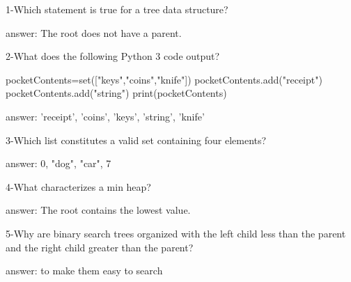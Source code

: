 1-Which statement is true for a tree data structure?


answer: The root does not have a parent.

2-What does the following Python 3 code output?

pocketContents=set(["keys","coins","knife"])
pocketContents.add("receipt")
pocketContents.add("string")
print(pocketContents)

answer: {'receipt', 'coins', 'keys', 'string', 'knife'}

3-Which list constitutes a valid set containing four elements?

answer: {0, "dog", "car", 7}

4-What characterizes a min heap?


answer: The root contains the lowest value.

5-Why are binary search trees organized with the left child less than the parent and the right child greater than the parent?


answer: to make them easy to search

